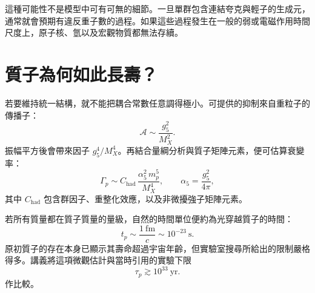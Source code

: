 這種可能性不是模型中可有可無的細節。一旦單群包含連結夸克與輕子的生成元，通常就會預期有違反重子數的過程。如果這些過程發生在一般的弱或電磁作用時間尺度上，原子核、氫以及宏觀物質都無法存續。

\section{質子為何如此長壽？}

\begin{classroomqa}
\end{classroomqa}

若要維持統一結構，就不能把耦合常數任意調得極小。可提供的抑制來自重粒子的傳播子：
\begin{equation}
\mathcal A
\sim
\frac{g_5^2}{M_X^2}.
\label{eq:l10-amplitude}
\end{equation}
振幅平方後會帶來因子 \(g_5^4/M_X^4\)。再結合量綱分析與質子矩陣元素，便可估算衰變率：
\begin{equation}
\Gamma_p
\sim
C_{\mathrm{had}}\,
\frac{\alpha_5^2\,m_p^5}{M_X^4},
\qquad
\alpha_5=\frac{g_5^2}{4\pi},
\label{eq:l10-rate}
\end{equation}
其中 \(C_{\mathrm{had}}\) 包含群因子、重整化效應，以及非微擾強子矩陣元素。


\begin{classroomqa}
\end{classroomqa}

若所有質量都在質子質量的量級，自然的時間單位便約為光穿越質子的時間：
\begin{equation}
t_p\sim\frac{1\ \mathrm{fm}}{c}\sim10^{-23}\ \mathrm{s}.
\label{eq:l10-proton-time}
\end{equation}
原初質子的存在本身已顯示其壽命超過宇宙年齡，但實驗室搜尋所給出的限制嚴格得多。講義將這項微觀估計與當時引用的實驗下限
\begin{equation}
\tau_p\gtrsim10^{33}\ \mathrm{yr}.
\label{eq:l10-lifetime-bound}
\end{equation}作比較。

